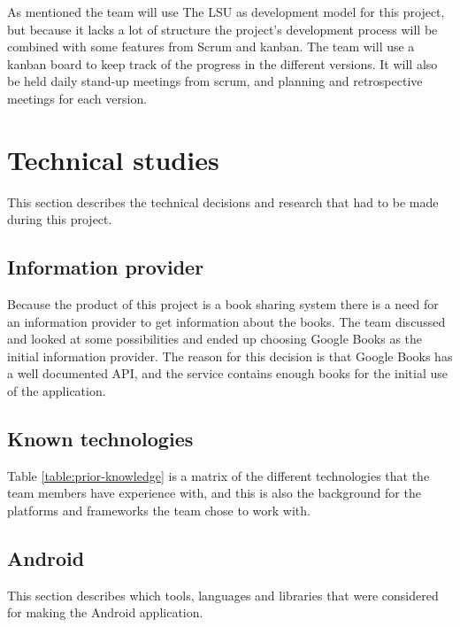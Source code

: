 As mentioned the team will use The \gls{LSU} as development model for this project, but because it lacks a lot of structure the project's development process will be combined with some features from Scrum and kanban. The team will use a kanban board to keep track of the progress in the different versions.\cite[p. 137]{lean-startup} It will also be held daily stand-up meetings from scrum, and planning and retrospective meetings for each version.


\section{Technical studies}
This section describes the technical decisions and research that had to be made during this project.
\subsection{Information provider}
Because the product of this project is a book sharing system there is a need for an information provider to get information about the books. The team discussed and looked at some possibilities and ended up choosing Google Books as the initial information provider. The reason for this decision is that Google Books has a well documented API, and the service contains enough books for the initial use of the application.



\subsection{Known technologies}
Table \ref{table:prior-knowledge} is a matrix of the different technologies that the team members have experience with, and this is also the background for the platforms and frameworks the team chose to work with.

\subsection{Android}
This section describes which tools, languages and libraries that were considered for making the Android application.

